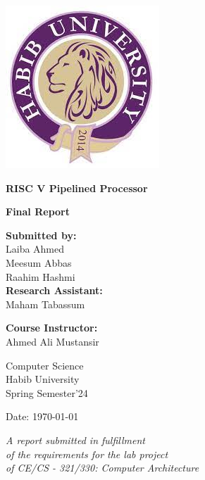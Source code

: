 \documentclass[12pt]{article}
\begin{document}
\begin{titlepage}
    \begin{center}
        \includegraphics[width=0.3\linewidth]{HU logo.jpg} 
        \vspace{1cm}

        \LARGE
        \textbf{RISC V Pipelined Processor}

        \vspace{1.5cm}
        \Large
        \textbf{Final Report}

        \vspace{2cm}
        \large
        \textbf{Submitted by:}\\
        Laiba Ahmed \\
        Meesum Abbas \\
        Raahim Hashmi \\

        \vspace{0.5cm}
        \large
        \textbf{Research Assistant:}\\
        Maham Tabassum

        \vspace{0.5cm}
        \large
       \textbf{ Course Instructor:}\\
       Ahmed Ali Mustansir

        \vspace{1cm}
        \large
        Computer Science \\ 
        Habib University\\
        Spring Semester'24

        \vspace{1cm}
        \large
        Date: \today 

        \vfill
        \small
        \textit{A report submitted in fulfillment\\
        of the requirements for the lab project\\ of 
        CE/CS - 321/330: Computer Architecture}

    \end{center}
\end{titlepage}
\tableofcontents
\end{document}
